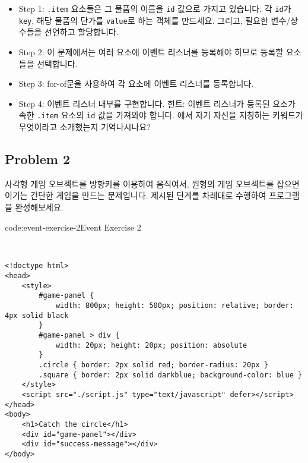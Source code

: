 \begin{itemize}
    \item Step 1: \texttt{.item} 요소들은 그 물품의 이름을 \texttt{id} 값으로 가지고 있습니다. 각 \texttt{id}가 \texttt{key}, 해당 물품의 단가를 \texttt{value}로 하는 객체를 만드세요. 그리고, 필요한 변수/상수들을 선언하고 할당합니다.
    \item Step 2: 이 문제에서는 여러 요소에 이벤트 리스너를 등록해야 하므로 등록할 요소들을 선택합니다.
    \item Step 3: for-of문을 사용하여 각 요소에 이벤트 리스너를 등록합니다.
    \item Step 4: 이벤트 리스너 내부를 구현합니다. 힌트: 이벤트 리스너가 등록된 요소가 속한 \texttt{.item} 요소의 \texttt{id} 값을 가져와야 합니다. 에서 자기 자신을 지칭하는 키워드가 무엇이라고 소개했는지 기억나시나요?
\end{itemize}

\subsection*{Problem 2}

사각형 게임 오브젝트를 방향키를 이용하여 움직여서, 원형의 게임 오브젝트를 잡으면 이기는 간단한 게임을 만드는 문제입니다. 제시된 단계를 차례대로 수행하여 프로그램을 완성해보세요.

\begin{codeenv}{code:event-exercise-2}{Event Exercise 2}\begin{verbatim}


<!doctype html>
<head>
    <style>
        #game-panel {
            width: 800px; height: 500px; position: relative; border: 4px solid black
        }
        #game-panel > div {
            width: 20px; height: 20px; position: absolute
        }
        .circle { border: 2px solid red; border-radius: 20px }
        .square { border: 2px solid darkblue; background-color: blue }
    </style>
    <script src="./script.js" type="text/javascript" defer></script>
</head>
<body>
    <h1>Catch the circle</h1>
    <div id="game-panel"></div>
    <div id="success-message"></div>
</body>
\end{verbatim}
\end{codeenv}


